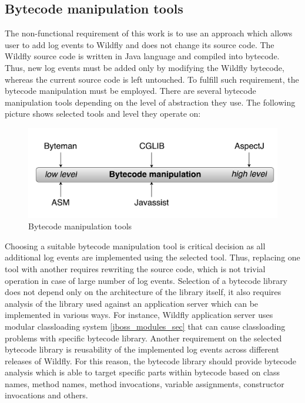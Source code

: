 \documentclass[12pt,oneside]{fithesis2}
\begin{document}
\subsection{Bytecode manipulation tools}
The non-functional requirement of this work is to use an approach which allows user to add log events to Wildfly and does not change its source code. The Wildfly source code is written in Java language and compiled into bytecode. Thus, new log events must be added only by modifying the Wildfly bytecode, whereas the current source code is left untouched. To fulfill such requirement, the bytecode manipulation must be employed. There are several bytecode manipulation tools depending on the level of abstraction they use. The following picture shows selected tools and level they operate on:
\begin{figure}[ht!]
	\centering
	\includegraphics[width=\textwidth]{images/bytecode_tools}
	\caption{Bytecode manipulation tools}
	\label{bytecode_tools}
\end{figure}

Choosing a suitable bytecode manipulation tool is critical decision as all additional log events are implemented using the selected tool. Thus, replacing one tool with another requires rewriting the source code, which is not trivial operation in case of large number of log events. Selection of a bytecode library does not depend only on the architecture of the library itself, it also requires analysis of the library used against an application server which can be implemented in various ways. For instance, Wildfly application server uses modular classloading system \ref{jboss_modules_sec} that can cause classloading problems with specific bytecode library. Another requirement on the selected bytecode library is reusability of the implemented log events across different releases of Wildfly. For this reason, the bytecode library should provide bytecode analysis which is able to target specific parts within bytecode based on class names, method names, method invocations, variable assignments, constructor invocations and others.
\end{document}
